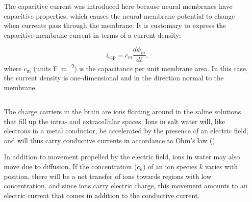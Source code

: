 The capacitive current was introduced here because neural membranes have capacitive properties, which causes the neural membrane potential to change when currents pass through the membrane. It is customary to express the capacitive membrane current in terms of a current density:

\begin{equation}
i_\text{cap} = c_m\frac{d\phi_m}{dt},
\label{eq:Basics:Icap_mem}
\end{equation}
where $c_\text{m}$ (units \si{\farad\per\square\metre}) is the capacitance per unit membrane area. In this case, the current density is one-dimensional and in the direction normal to the membrane.


\subsection{}
\label{sec:Basics:DiffusiveCurrent}
 
The charge carriers in the brain are ions floating around in the saline solutions that fill up the intra- and extracellular spaces. Ions in salt water will, like electrons in a metal conductor, be accelerated by the presence of an electric field, and will thus carry conductive currents in accordance to Ohm's law ().

In addition to movement propelled by the electric field, ions in water may also move due to diffusion. If the concentration ($c_k$) of an ion species $k$ varies with position, there will be a net transfer of ions towards regions with low concentration, and since ions carry electric charge, this movement amounts to an electric current that comes in addition to the conductive current. 


